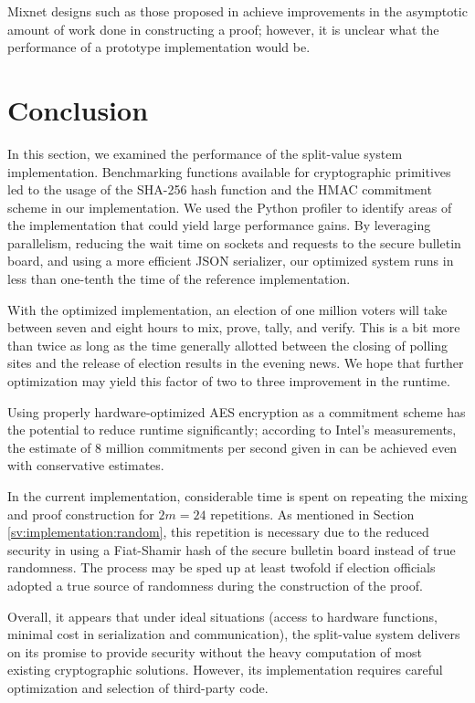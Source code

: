 Mixnet designs such as those proposed in \cite{chase13} achieve improvements in the asymptotic amount of work done in constructing a proof; however, it is unclear what the performance of a prototype implementation would be.

\section{Conclusion} \label{perf:conclusion}

In this section, we examined the performance of the split-value system implementation. Benchmarking functions available for cryptographic primitives led to the usage of the SHA-256 hash function and the HMAC commitment scheme in our implementation. We used the Python profiler to identify areas of the implementation that could yield large performance gains. By leveraging parallelism, reducing the wait time on sockets and requests to the secure bulletin board, and using a more efficient JSON serializer, our optimized system runs in less than one-tenth the time of the reference implementation.

With the optimized implementation, an election of one million voters will take between seven and eight hours to mix, prove, tally, and verify. This is a bit more than twice as long as the time generally allotted between the closing of polling sites and the release of election results in the evening news. We hope that further optimization may yield this factor of two to three improvement in the runtime.

Using properly hardware-optimized AES encryption as a commitment scheme has the potential to reduce runtime significantly; according to Intel's measurements, the estimate of 8 million commitments per second given in \cite{rrv} can be achieved even with conservative estimates.

In the current implementation, considerable time is spent on repeating the mixing and proof construction for $2m = 24$ repetitions. As mentioned in Section \ref{sv:implementation:random}, this repetition is necessary due to the reduced security in using a Fiat-Shamir hash of the secure bulletin board instead of true randomness. The process may be sped up at least twofold if election officials adopted a true source of randomness during the construction of the proof.

Overall, it appears that under ideal situations (access to hardware functions, minimal cost in serialization and communication), the split-value system delivers on its promise to provide security without the heavy computation of most existing cryptographic solutions. However, its implementation requires careful optimization and selection of third-party code.
